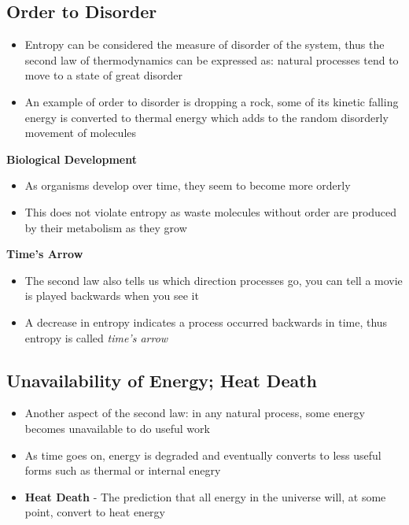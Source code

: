 \subsection{Order to Disorder}
\begin{itemize}
    \item Entropy can be considered the measure of disorder of the system, thus the second law of thermodynamics can be expressed as: natural processes tend to move to a state of great disorder
    \item An example of order to disorder is dropping a rock, some of its kinetic falling energy is converted to thermal energy which adds to the random disorderly movement of molecules
\end{itemize}

\textbf{Biological Development}
\begin{itemize}
    \item As organisms develop over time, they seem to become more orderly
    \item This does not violate entropy as waste molecules without order are produced by their metabolism as they grow
\end{itemize}

\textbf{Time's Arrow}
\begin{itemize}
    \item The second law also tells us which direction processes go, you can tell a movie is played backwards when you see it
    \item A decrease in entropy indicates a process occurred backwards in time, thus entropy is called \emph{time's arrow}
\end{itemize}

\subsection{Unavailability of Energy; Heat Death}
\begin{itemize}
    \item Another aspect of the second law: in any natural process, some energy becomes unavailable to do useful work
    \item As time goes on, energy is degraded and eventually converts to less useful forms such as thermal or internal enegry
    \item \textbf{Heat Death} - The prediction that all energy in the universe will, at some point, convert to heat energy
\end{itemize}

